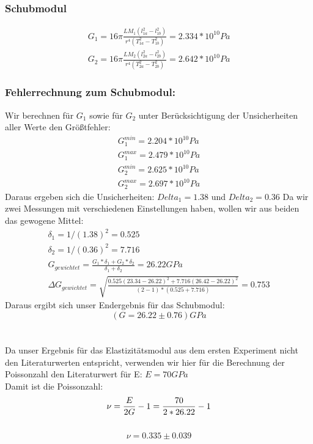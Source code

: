 \documentclass{article}
\begin{document}
\subsubsection*{Schubmodul}
\begin{gather*}
G_1=16\pi\frac{LM_1(l_{1a}^2-l_{1b}^2)}{r^4(T_{1a}^2-T_{1b}^2)}=2.334*10^{10} Pa\\
G_2=16\pi\frac{LM_2(l_{2a}^2-l_{2b}^2)}{r^4(T_{2a}^2-T_{2b}^2)}=2.642*10^{10} Pa
\end{gather*} 
\subsubsection*{Fehlerrechnung zum Schubmodul:}
Wir berechnen für $G_1$ sowie für $G_2$ unter Berücksichtigung der Unsicherheiten aller Werte den Größtfehler:
\begin{gather*}
G^{min}_1=2.204*10^{10} Pa\\
G^{max}_1=2.479*10^{10} Pa\\
G^{min}_2=2.625*10^{10} Pa\\
G^{max}_2=2.697*10^{10} Pa
\end{gather*}
Daraus ergeben sich die Unsicherheiten: $Delta_1=1.38$ und $Delta_2=0.36$
Da wir zwei Messungen mit verschiedenen Einstellungen haben, wollen wir aus beiden das gewogene Mittel:
\begin{gather*}
\delta_1=1/(1.38)^2=0.525\\
\delta_2=1/(0.36)^2=7.716\\
G_{gewichtet}=\frac{G_1*\delta_1 + G_2*\delta_2}{\delta_1 + \delta_2}=26.22 GPa\\
\Delta G_{gewichtet}=\sqrt{\frac{0.525(23.34-26.22)^2+7.716(26.42-26.22)^2}{(2-1)*(0.525+7.716)}}=0.753
\end{gather*}
Daraus ergibt sich unser Endergebnis für das Schubmodul:\\
$$\boxed{(G=26.22 \pm 0.76) GPa}$$\\
\\
Da unser Ergebnis für das Elastizitätsmodul aus dem ersten Experiment nicht den Literaturwerten entspricht, verwenden wir hier für die Berechnung der Poissonzahl den Literaturwert für E: $E=70GPa$\\
Damit ist die Poissonzahl:\\
$$\nu = \frac{E}{2G} -1  = \frac{70}{2*26.22} -1\\$$\\
$$\boxed{\nu = 0.335 \pm 0.039}$$
\end{document}
